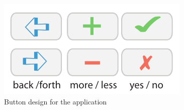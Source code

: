 \begin{figure}[htb]
    \centering
    \includegraphics[scale=1.0]{gfx/button.pdf}
    \caption{Button design for the application}
    \label{fig:button_design}
\end{figure}